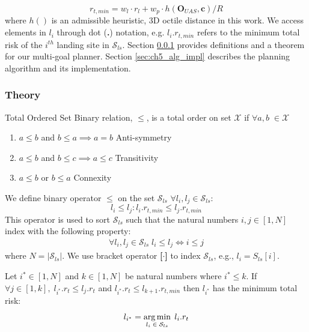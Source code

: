 \begin{equation}
    r_{t,min} = w_{l} \cdot r_{l} + w_p \cdot  h(\mathbf{O}_{UAS}, \mathbf{c}) / R
\end{equation}
where $h()$ is an admissible heuristic, 3D octile distance in this work. We access elements in $l_i$ through dot (\textbf{.}) notation, e.g. $l_i.r_{t,min}$ refers to the minimum total risk of the $i^{th}$ landing site in $\mathcal{S}_{ls}$. Section \ref{sec:ch5_theorom} provides definitions and a theorem for our multi-goal planner. Section \ref{sec:ch5_alg_impl} describes the planning algorithm and its implementation.

\subsubsection{Theory}\label{sec:ch5_theorom}


\begin{definition}{Total Ordered Set}\label{def:total_order}
Binary relation, $\le$, is a total order on set $\mathcal{X}$ if $\forall a,b \; \in \mathcal{X}$
\begin{enumerate}
    \item $a \le b$ and $b \le a \implies a = b$ \quad Anti-symmetry
    \item $a \le b$ and $b \le c \implies a \le c$ \quad Transitivity
    \item $a \le b$ or $b \le a$  \quad Connexity
\end{enumerate}
\end{definition}
We define binary operator $\le$ on the set $\mathcal{S}_{ls}$  $\forall l_i,l_j \in \mathcal{S}_{ls}$:
\begin{equation}
    l_{i} \le l_{j} : l_{i}.r_{t,min} \le l_{j}.r_{t,min}
\end{equation}
This operator is used to sort $\mathcal{S}_{ls}$ such that the natural numbers $i,j \in [1, N]$ index with the following property:
\begin{align}
   \forall l_i, l_j \in \mathcal{S}_{ls} \; l_i \le l_j \iff i \le j
\end{align}
where $N = |\mathcal{S}_{ls}|$. We use bracket operator \textbf{[$\cdot$]} to index $\mathcal{S}_{ls}$, e.g., $l_i = {S}_{ls}[i]$.

\begin{theorem}\label{thm:ch5_thm1}
Let $i^{*} \in [1, N]$ and $k \in [1, N]$ be natural numbers where $i^* \le k$.  If $\forall j \in [1, k],\; l_{i^{*}}.r_{t} \le l_j.r_{t}$ and  $l_{i^{*}}.r_{t} \le l_{k+1}.r_{t,min}$  then $l_{i^{*}}$ has the minimum total risk: 
\begin{equation}
    l_{i^{*}} = \operatorname*{arg\,min}_{l_i \; \in \; \mathcal{S}_{ls}} \; l_i.r_{t}
\end{equation}

\end{theorem}

